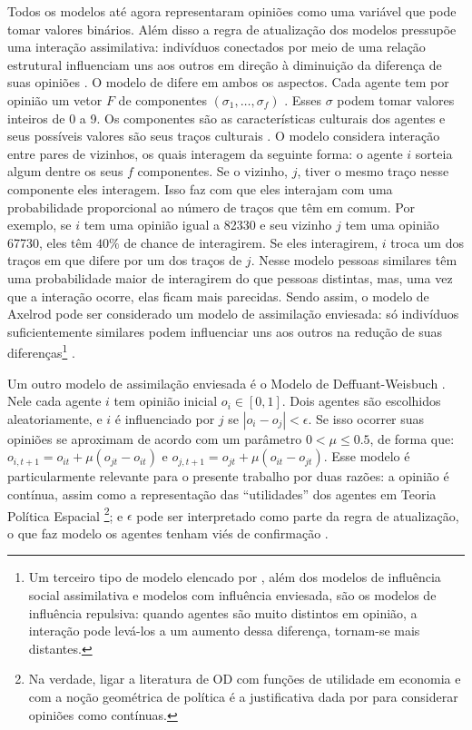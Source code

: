   
  Todos os modelos até agora representaram opiniões como uma variável que pode
  tomar valores binários. Além disso a regra de atualização dos modelos
  pressupõe uma interação assimilativa: indivíduos conectados por meio de uma
  relação estrutural influenciam uns aos outros em direção à diminuição da
  diferença de suas opiniões \cite{flache2017}. O modelo de
   difere em ambos os aspectos. Cada agente
  tem por opinião um vetor $F$ de componentes $(\sigma_1 , \ldots, \sigma_f)$
  \cite{klemm2003role}. Esses $\sigma$ podem tomar valores inteiros de 0 a 9. Os
  componentes são as características culturais dos agentes e seus possíveis
  valores são seus traços culturais \cite{gomes2014}. O modelo considera
  interação entre pares de vizinhos, os quais interagem da seguinte forma: o
  agente \(i\) sorteia algum dentre os seus \(f\) componentes. Se o vizinho,
  \(j\), tiver o mesmo traço nesse componente eles interagem. Isso faz com que
  eles interajam com uma probabilidade proporcional ao número de traços que têm
  em comum. Por exemplo, se \(i\) tem uma opinião igual a 82330 e seu vizinho
  \(j\) tem uma opinião 67730, eles têm \(40 \%\) de chance de interagirem. Se
  eles interagirem, \(i\) troca um dos traços em que difere por um dos traços de
  \(j\)\cite{axelrod1997dissemination}. Nesse modelo pessoas similares têm uma
  probabilidade maior de interagirem do que pessoas distintas, mas, uma vez que
  a interação ocorre, elas ficam mais parecidas. Sendo assim, o modelo de
  Axelrod pode ser considerado um modelo de assimilação enviesada: só indivíduos
  suficientemente similares podem influenciar uns aos outros na redução de suas
  diferenças\footnote{Um terceiro tipo de modelo elencado por
    , além dos modelos de influência social assimilativa
    e modelos com influência enviesada, são os modelos de influência repulsiva:
    quando agentes são muito distintos em opinião, a interação pode levá-los a
    um aumento dessa diferença, tornam-se mais distantes.} \cite{flache2017}.

  Um outro modelo de assimilação enviesada é o Modelo de Deffuant-Weisbuch
  \cite{deffuant2000mixing}. Nele cada agente \(i\) tem opinião inicial \( o_i \in
  [0,1]\). Dois agentes são escolhidos aleatoriamente, e \(i\) é influenciado
  por \(j\) se \(| o_i - o_j| < \epsilon\). Se isso ocorrer suas opiniões se aproximam
  de acordo com um parâmetro $0 < \mu \leq 0.5$, de forma que: $o_{i,t+1} = o_{it} +
  \mu(o_{jt} - o_{it})$ e  $o_{j,t+1} = o_{jt} +
  \mu(o_{it} - o_{jt})$. Esse modelo é particularmente relevante para o presente
  trabalho  por duas razões: a opinião é contínua, assim como a representação
  das ``utilidades'' dos agentes em Teoria Política Espacial \footnote{Na
    verdade, ligar a literatura de OD com funções de utilidade em economia e com
    a noção geométrica de política é a justificativa dada por
     para considerar opiniões como contínuas.}; e
  \(\epsilon\) pode ser interpretado como parte da regra de atualização, o que faz
  modelo os agentes tenham viés de confirmação \cite{flache2017}.

